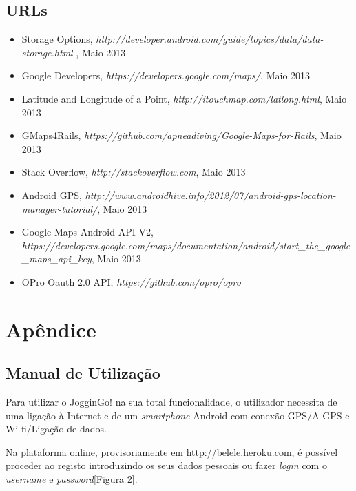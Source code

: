 \documentclass[15pt,a4paper]{article}
\begin{document}
\subsection{URLs}

\begin{itemize}
\item Storage Options, \emph{http://developer.android.com/guide/topics/data/data-storage.html
}, Maio 2013
\item Google Developers, \emph{https://developers.google.com/maps/}, Maio 2013

\item Latitude and Longitude of a Point, \emph{http://itouchmap.com/latlong.html}, Maio 2013
\item GMaps4Rails, \emph{https://github.com/apneadiving/Google-Maps-for-Rails}, Maio 2013

\item Stack Overflow, \emph{http://stackoverflow.com}, Maio 2013

\item Android GPS, \emph{http://www.androidhive.info/2012/07/android-gps-location-manager-tutorial/}, Maio 2013

\item Google Maps Android API V2, \emph{https://developers.google.com/maps/documentation/android/start\_the\_google\_maps\_api\_key}, Maio 2013

\item OPro Oauth 2.0 API, \emph{https://github.com/opro/opro}

\end{itemize}


\newpage
\appendix
\section{Apêndice}
\subsection{Manual de Utilização}

Para utilizar o JogginGo! na sua total funcionalidade, o utilizador necessita de uma ligação à Internet e de um \textit{smartphone} Android com conexão GPS/A-GPS e Wi-fi/Ligação de dados.

Na plataforma online, provisoriamente em http://belele.heroku.com, é possível proceder ao registo introduzindo os seus dados pessoais ou fazer \textit{login} com o \textit{username} e \textit{password}[Figura 2].
\end{document}
